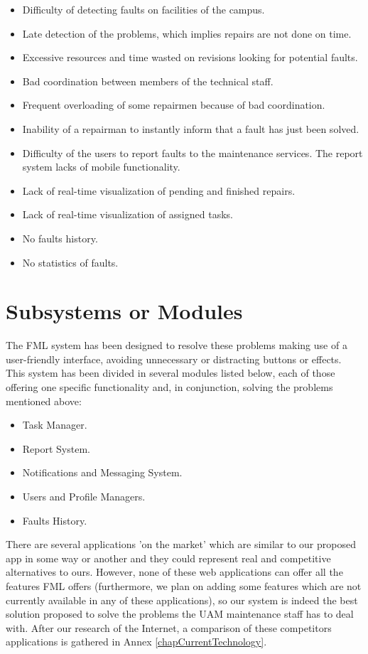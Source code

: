 \documentclass{report}
\begin{document}
\begin{itemize}
\item Difficulty of detecting faults on facilities of the campus.
\item Late detection of the problems, which implies repairs are not done on time.
\item Excessive resources and time wasted on revisions looking for potential faults.
\item Bad coordination between members of the technical staff.
\item Frequent overloading of some repairmen because of bad coordination.
\item Inability of a repairman to instantly inform that a fault has just been solved.
\item Difficulty of the users to report faults to the maintenance services.
The report system lacks of mobile functionality.
\item Lack of real-time visualization of pending and finished repairs.
\item Lack of real-time visualization of assigned tasks.
\item No faults history.
\item No statistics of faults.
\end{itemize}

\section{Subsystems or Modules}

The FML system has been designed to resolve these problems making use of a user-friendly interface, avoiding unnecessary or distracting buttons or effects. This system has been divided in several modules listed below, each of those offering one specific functionality and, in conjunction, solving the problems mentioned above:
\begin{itemize}
\item Task Manager.
\item Report System.
\item Notifications and Messaging System.
\item Users and Profile Managers.
\item Faults History.
\end{itemize}

There are several applications 'on the market' which are similar to our proposed app in some way or another and they could represent real and competitive alternatives to ours. However, none of these web applications can offer all the features FML offers (furthermore, we plan on adding some features which are not currently available in any of these applications), so our system is indeed the best solution proposed to solve the problems the UAM maintenance staff has to deal with. After our research of the Internet, a comparison of these competitors applications is gathered in Annex \ref{chapCurrentTechnology}.
\end{document}
